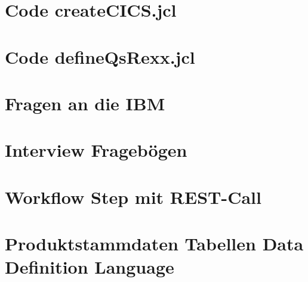 \section{Code createCICS.jcl}\label{app:createcics}


\section{Code defineQsRexx.jcl}\label{app:qsrexx}


\section{Fragen an die IBM}\label{app:ibm}



\section{Interview Fragebögen}\label{app:fragen}










\section{Workflow Step mit REST-Call}\label{app:db2prov}


\section{Produktstammdaten Tabellen Data Definition Language}\label{app:ddl}

\pagebreak